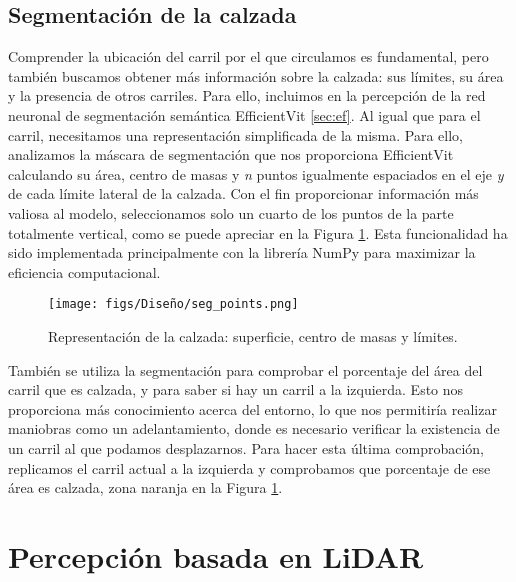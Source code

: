 \subsection{Segmentación de la calzada}
\label{sec:per_ef}

Comprender la ubicación del carril por el que circulamos es fundamental, pero también buscamos obtener más información sobre la calzada: sus límites, su área y la presencia de otros carriles. Para ello, incluimos en la percepción de la red neuronal de segmentación semántica EfficientVit \ref{sec:ef}. Al igual que para el carril, necesitamos una representación simplificada de la misma. Para ello, analizamos la máscara de segmentación que nos proporciona EfficientVit calculando su área, centro de masas y \textit{n} puntos igualmente espaciados en el eje \textit{y} de cada límite lateral de la calzada. Con el fin proporcionar información más valiosa al modelo, seleccionamos solo un cuarto de los puntos de la parte totalmente vertical, como se puede apreciar en la Figura \ref{fig:seg_params}. Esta funcionalidad ha sido implementada principalmente con la librería NumPy para maximizar la eficiencia computacional.
\begin{figure}[ht]
\centering
\texttt{[image: figs/Diseño/seg\_points.png]}
\caption{Representación de la calzada: superficie, centro de masas y límites.}
\label{fig:seg_params}
\end{figure}

También se utiliza la segmentación para comprobar el porcentaje del área del carril que es calzada, y para saber si hay un carril a la izquierda. Esto nos proporciona más conocimiento acerca del entorno, lo que nos permitiría realizar maniobras como un adelantamiento, donde es necesario verificar la existencia de un carril al que podamos desplazarnos. Para hacer esta última comprobación, replicamos el carril actual a la izquierda y comprobamos que porcentaje de ese área es calzada, zona naranja en la Figura \ref{fig:seg_params}.

\section{Percepción basada en \ac{LiDAR}}

